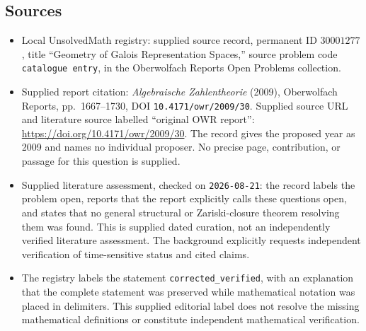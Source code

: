 \documentclass[11pt]{article}
\begin{document}
\subsection{Sources}
\begin{itemize}
\item Local UnsolvedMath registry: supplied source record, permanent ID \(30001277\), title ``Geometry of Galois Representation Spaces,'' source problem code \texttt{catalogue entry}, in the Oberwolfach Reports Open Problems collection.
\item Supplied report citation: \emph{Algebraische Zahlentheorie} (2009), Oberwolfach Reports, pp.~1667--1730, DOI \texttt{10.4171/owr/2009/30}. Supplied source URL and literature source labelled ``original OWR report'': \url{https://doi.org/10.4171/owr/2009/30}. The record gives the proposed year as 2009 and names no individual proposer. No precise page, contribution, or passage for this question is supplied.
\item Supplied literature assessment, checked on \texttt{2026-08-21}: the record labels the problem open, reports that the report explicitly calls these questions open, and states that no general structural or Zariski-closure theorem resolving them was found. This is supplied dated curation, not an independently verified literature assessment. The background explicitly requests independent verification of time-sensitive status and cited claims.
\item The registry labels the statement \texttt{corrected\_verified}, with an explanation that the complete statement was preserved while mathematical notation was placed in delimiters. This supplied editorial label does not resolve the missing mathematical definitions or constitute independent mathematical verification.
\end{itemize}
\end{document}

